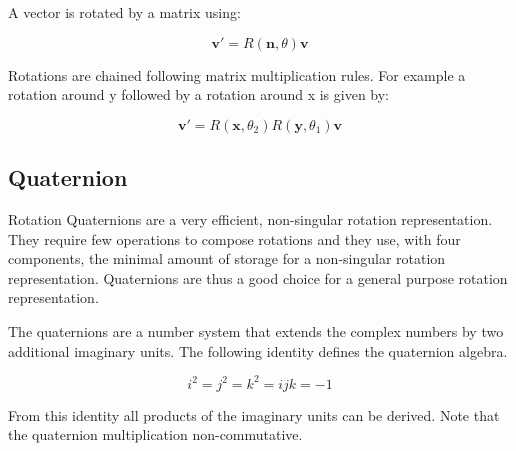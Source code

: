 \documentclass[a4paper]{paper}
\begin{document}
A vector is rotated by a matrix using:


\begin{equation}
    \bm{v}' = R(\bm{n}, \theta) \bm{v}
\end{equation}


Rotations are chained following matrix multiplication rules. For example a rotation around y followed by a rotation around x is given by:

\begin{equation}
    \bm{v}' = R(\bm{x}, \theta_2) R(\bm{y}, \theta_1) \bm{v}
\end{equation}

\subsection{Quaternion}

Rotation Quaternions are a very efficient, non-singular rotation representation.
They require few operations to compose rotations and they use, with four components, the minimal amount of storage for a non-singular rotation representation.
Quaternions are thus a good choice for a general purpose rotation representation.

The quaternions are a number system that extends the complex numbers by two additional imaginary units. The following identity defines the quaternion algebra.

\begin{equation}
    i^2 = j^2 = k^2 = ijk = -1
\end{equation}

From this identity all products of the imaginary units can be derived. Note that the quaternion multiplication non-commutative.
\end{document}
